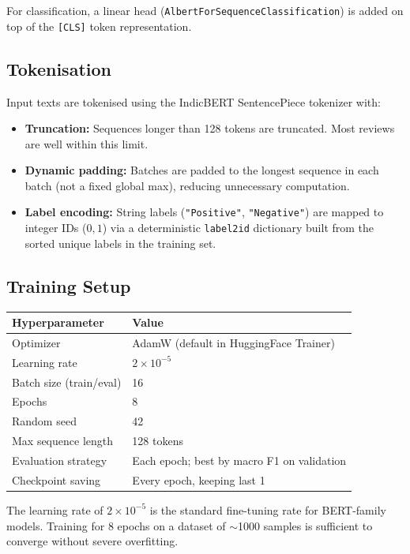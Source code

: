 \documentclass[11pt,a4paper]{article}
\begin{document}
For classification, a linear head (\texttt{AlbertForSequenceClassification}) is added on top of the \texttt{[CLS]} token representation.

\subsection{Tokenisation}

Input texts are tokenised using the IndicBERT SentencePiece tokenizer with:
\begin{itemize}[noitemsep]
    \item \textbf{Truncation:} Sequences longer than 128 tokens are truncated. Most reviews are well within this limit.
    \item \textbf{Dynamic padding:} Batches are padded to the longest sequence in each batch (not a fixed global max), reducing unnecessary computation.
    \item \textbf{Label encoding:} String labels (\texttt{"Positive"}, \texttt{"Negative"}) are mapped to integer IDs ($0, 1$) via a deterministic \texttt{label2id} dictionary built from the sorted unique labels in the training set.
\end{itemize}

\subsection{Training Setup}

\begin{center}
\begin{tabular}{ll}
\toprule
\textbf{Hyperparameter} & \textbf{Value} \\
\midrule
Optimizer               & AdamW (default in HuggingFace Trainer) \\
Learning rate           & $2 \times 10^{-5}$ \\
Batch size (train/eval) & 16 \\
Epochs                  & 8 \\
Random seed             & 42 \\
Max sequence length     & 128 tokens \\
Evaluation strategy     & Each epoch; best by macro F1 on validation \\
Checkpoint saving       & Every epoch, keeping last 1 \\
\bottomrule
\end{tabular}
\end{center}

The learning rate of $2 \times 10^{-5}$ is the standard fine-tuning rate for BERT-family models. Training for 8 epochs on a dataset of $\sim$1000 samples is sufficient to converge without severe overfitting.
\end{document}
